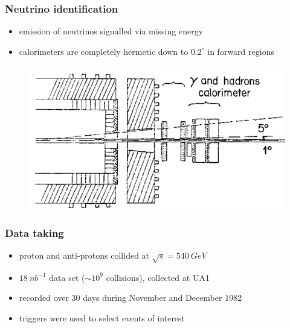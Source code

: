 \documentclass[xcolor=table]{beamer}
\begin{document}

\begin{frame}
\frametitle{Neutrino identification}
\fontsize{9pt}{12}\selectfont


\begin{itemize}
\item emission of neutrinos signalled via missing energy
\item calorimeters are completely hermetic down to $0.2^\circ$ in forward regions
\end{itemize}

\begin{figure}[h]
\centering
\includegraphics[height=0.6\textheight]{images/forward-region.png}
\end{figure}


\end{frame}



\begin{frame}
\frametitle{Data taking}

\begin{itemize}
\item proton and anti-protons collided at $\sqrt{s}=\SI{540}{GeV}$
\item $\SI{18}{nb^{-1}}$ data set ($\sim 10^9$ collisions), collected at UA1
\item recorded over 30 days during November and December 1982
\item triggers were used to select events of interest
\end{itemize}


\end{frame}

\end{document}
